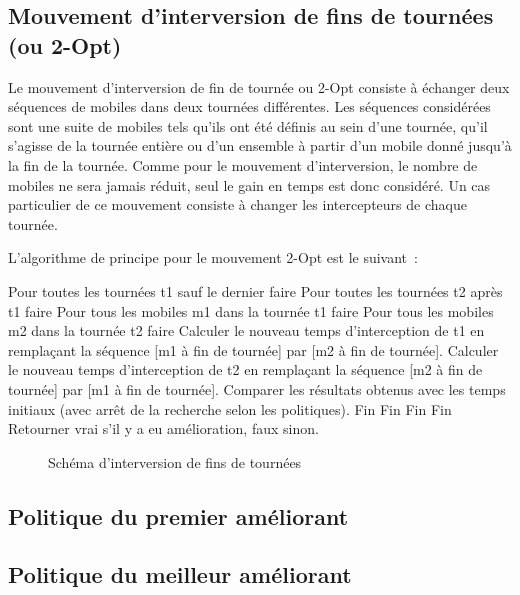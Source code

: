 		\subsection{Mouvement d'interversion de fins de tournées (ou 2-Opt)}
			Le mouvement d'interversion de fin de tournée ou 2-Opt consiste à échanger deux séquences de mobiles dans deux tournées différentes. Les séquences considérées sont une suite de mobiles tels qu'ils ont été définis au sein d'une tournée, qu'il s'agisse de la tournée entière ou d'un ensemble à partir d'un mobile donné jusqu'à la fin de la tournée. Comme pour le mouvement d'interversion, le nombre de mobiles ne sera jamais réduit, seul le gain en temps est donc considéré. Un cas particulier de ce mouvement consiste à changer les intercepteurs de chaque tournée.

			L'algorithme de principe pour le mouvement 2-Opt est le suivant :
			
Pour toutes les tournées t1 sauf le dernier faire
	Pour toutes les tournées t2 après t1 faire
		Pour tous les mobiles m1 dans la tournée t1 faire
			Pour tous les mobiles m2 dans la tournée t2 faire
				Calculer le nouveau temps d'interception de t1 en remplaçant la 					séquence [m1 à fin de tournée] par [m2 à fin de tournée].
				Calculer le nouveau temps d'interception de t2 en remplaçant la 					séquence [m2 à fin de tournée] par [m1 à fin de tournée].
				Comparer les résultats obtenus avec les temps initiaux (avec arrêt de 				la recherche selon les politiques).
			Fin
		Fin
	Fin
Fin
Retourner vrai s'il y a eu amélioration, faux sinon.
			
			\begin{figure}[h!]
			\centering
			\begin{tikzpicture}[schema]
				
			\end{tikzpicture}
			\caption{Schéma d'interversion de fins de tournées}
			\label{fig:move_2opt}
			\end{figure}

		\subsection{Politique du premier améliorant}
			\label{subs:first_available_policy}

		\subsection{Politique du meilleur améliorant}
			\label{subs:best_available_policy}


